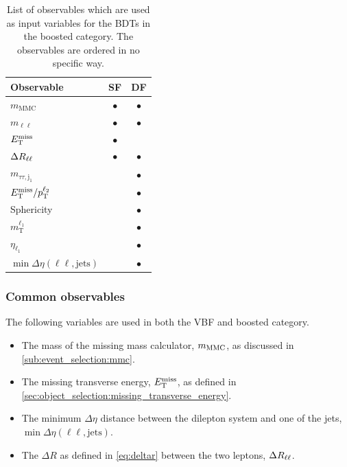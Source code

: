 \begin{table}[htpb]
    \centering
    \caption{List of observables which are used as input variables for the BDTs in the boosted category.
             The observables are ordered in no specific way.}\label{tab:mva:variables:boost}
    \begin{tabular}{lcc}
        \toprule
        Observable                                  & SF        & DF        \\ \midrule
        $m_\text{MMC}$                              & $\bullet$ & $\bullet$ \\
        $m_{\ell\ell}$                              & $\bullet$ & $\bullet$ \\
        $E_\text{T}^\text{miss}$                                   & $\bullet$ &           \\
        $\Delta R_{\ell\ell}$                                     & $\bullet$ & $\bullet$ \\
        $m_{\tau\tau,\text{j}_1}$                   &           & $\bullet$ \\
        $E_\text{T}^\text{miss} / p_\text{T}^{\ell_2}$                    &           & $\bullet$ \\
        Sphericity                                  &           & $\bullet$ \\
        $m_\text{T}^{\ell_1}$                       &           & $\bullet$ \\
        $\eta_{\ell_1}$                             &           & $\bullet$ \\
        $\min \Delta \eta (\ell\ell, \text{jets})$  &           & $\bullet$ \\
        \bottomrule
    \end{tabular}
\end{table}

\subsubsection{Common observables}
The following variables are used in both the VBF and boosted category.
\begin{itemize}
    \item The mass of the missing mass calculator, $m_\text{MMC}$, as discussed in \cref{sub:event_selection:mmc}.
    \item The missing transverse energy, $E_\text{T}^\text{miss}$, as defined in \cref{sec:object_selection:missing_transverse_energy}.
    \item The minimum $\Delta \eta$ distance between the dilepton system and one of the jets, $\min \Delta \eta (\ell\ell, \text{jets})$.
    \item The $\Delta R$ as defined in \cref{eq:deltar} between the two leptons, $\Delta R_{\ell\ell}$.
\end{itemize}


